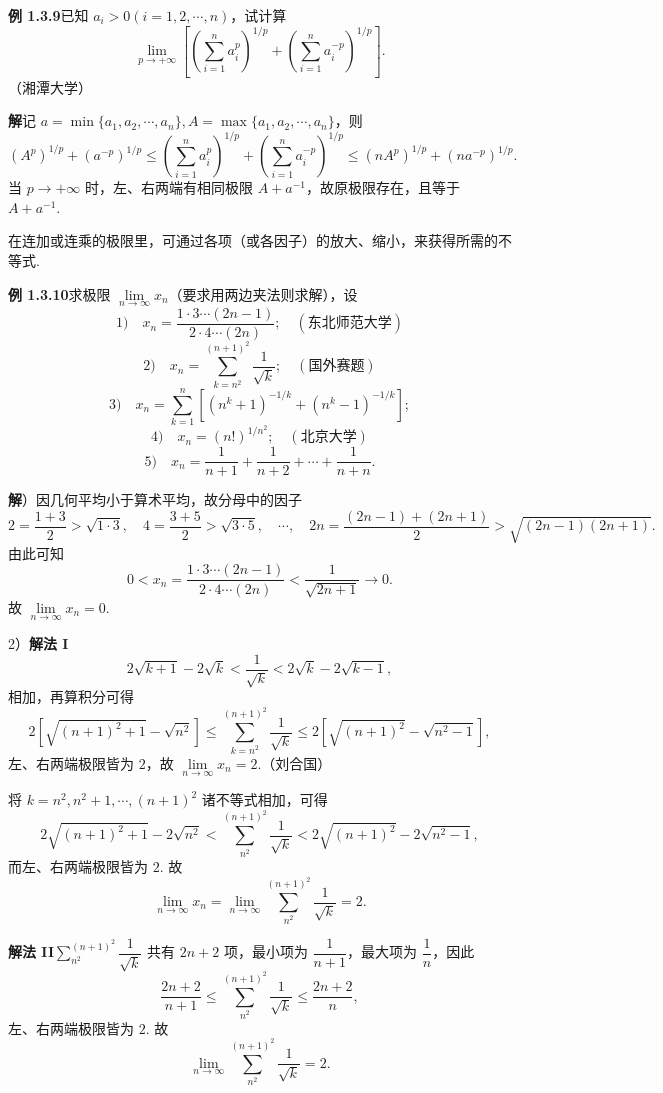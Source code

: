 \documentclass[UTF8, 12pt, fontset=fandol, oneside]{ctexart}
\begin{document}
\noindent\textbf{例 1.3.9}\quad 已知 $a_i>0(i=1,2,\cdots,n)$，试计算
\[
  \lim_{p\to+\infty}\left[\left(\sum_{i=1}^n a_i^p\right)^{1/p}
  +\left(\sum_{i=1}^n a_i^{-p}\right)^{1/p}\right].
\]
（湘潭大学）

\noindent\textbf{解}\quad 记 $a=\min\{a_1,a_2,\cdots,a_n\},A=\max\{a_1,a_2,\cdots,a_n\}$，则
\[
  (A^p)^{1/p}+(a^{-p})^{1/p}
  \le \left(\sum_{i=1}^n a_i^p\right)^{1/p}
  +\left(\sum_{i=1}^n a_i^{-p}\right)^{1/p}
  \le (nA^p)^{1/p}+(na^{-p})^{1/p}.
\]
当 $p\to+\infty$ 时，左、右两端有相同极限 $A+a^{-1}$，故原极限存在，且等于 $A+a^{-1}$.

在连加或连乘的极限里，可通过各项（或各因子）的放大、缩小，来获得所需的不等式.

\noindent\textbf{例 1.3.10}\quad 求极限 $\lim\limits_{n\to\infty}x_n$（要求用两边夹法则求解），设
\[
1)\quad x_n=\frac{1\cdot3\cdots(2n-1)}{2\cdot4\cdots(2n)};\quad(\text{东北师范大学})
\]
\[
2)\quad x_n=\sum_{k=n^2}^{(n+1)^2}\frac1{\sqrt k};\quad(\text{国外赛题})
\]
\[
3)\quad x_n=\sum_{k=1}^n\left[(n^k+1)^{-1/k}+(n^k-1)^{-1/k}\right];
\]
\[
4)\quad x_n=(n!)^{1/n^2};\quad(\text{北京大学})
\]
\[
5)\quad x_n=\frac1{n+1}+\frac1{n+2}+\cdots+\frac1{n+n}.
\]

\noindent\textbf{解}）因几何平均小于算术平均，故分母中的因子
\[
2=\frac{1+3}{2}>\sqrt{1\cdot3},\quad
4=\frac{3+5}{2}>\sqrt{3\cdot5},\quad\cdots,\quad
2n=\frac{(2n-1)+(2n+1)}2>\sqrt{(2n-1)(2n+1)}.
\]
由此可知
\[
  0<x_n=\frac{1\cdot3\cdots(2n-1)}{2\cdot4\cdots(2n)}
  <\frac1{\sqrt{2n+1}}\to0.
\]
故 $\lim\limits_{n\to\infty}x_n=0$.

2）\textbf{解法 I}\quad
\[
  2\sqrt{k+1}-2\sqrt k<\frac1{\sqrt k}<2\sqrt k-2\sqrt{k-1},
\]
相加，再算积分可得
\[
  2\left[\sqrt{(n+1)^2+1}-\sqrt{n^2}\right]
  \le \sum_{k=n^2}^{(n+1)^2}\frac1{\sqrt k}
  \le 2\left[\sqrt{(n+1)^2}-\sqrt{n^2-1}\right],
\]
左、右两端极限皆为 $2$，故 $\lim\limits_{n\to\infty}x_n=2$.（刘合国）

将 $k=n^2,n^2+1,\cdots,(n+1)^2$ 诸不等式相加，可得
\[
2\sqrt{(n+1)^2+1}-2\sqrt{n^2}
<\sum_{n^2}^{(n+1)^2}\frac1{\sqrt k}
<2\sqrt{(n+1)^2}-2\sqrt{n^2-1},
\]
而左、右两端极限皆为 $2$. 故
\[
  \lim_{n\to\infty}x_n=\lim_{n\to\infty}\sum_{n^2}^{(n+1)^2}\frac1{\sqrt k}=2.
\]

\noindent\textbf{解法 II}\quad $\sum\limits_{n^2}^{(n+1)^2}\dfrac1{\sqrt k}$ 共有 $2n+2$ 项，最小项为 $\dfrac1{n+1}$，最大项为 $\dfrac1n$，因此
\[
  \frac{2n+2}{n+1}\le\sum_{n^2}^{(n+1)^2}\frac1{\sqrt k}\le\frac{2n+2}{n},
\]
左、右两端极限皆为 $2$. 故
\[
  \lim_{n\to\infty}\sum_{n^2}^{(n+1)^2}\frac1{\sqrt k}=2.
\]
\end{document}
